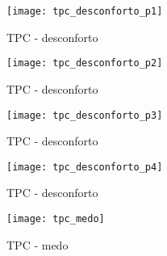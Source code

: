 \begin{figure}[ht!]
    \centering
    \begin{minipage}{\textwidth}
        \caption{TPC - desconforto}
        \texttt{[image: tpc\_desconforto\_p1]}
    \end{minipage}
\end{figure}

\begin{figure}[ht!]
    \centering
    \begin{minipage}{\textwidth}
        \caption{TPC - desconforto}
        \texttt{[image: tpc\_desconforto\_p2]}
    \end{minipage}
\end{figure}

\begin{figure}[ht!]
    \centering
    \begin{minipage}{\textwidth}
        \caption{TPC - desconforto}
        \texttt{[image: tpc\_desconforto\_p3]}
    \end{minipage}
\end{figure}

\begin{figure}[ht!]
    \centering
    \begin{minipage}{\textwidth}
        \caption{TPC - desconforto}
        \texttt{[image: tpc\_desconforto\_p4]}
    \end{minipage}
\end{figure}

\begin{figure}[ht!]
    \centering
    \begin{minipage}{\textwidth}
        \caption{TPC - medo}
        \texttt{[image: tpc\_medo]}
    \end{minipage}
\end{figure}